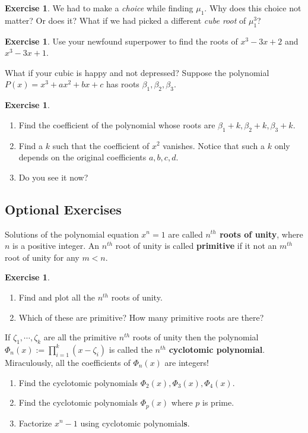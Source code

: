 \documentclass[reqno, 12pt, letter]{article}
\theoremstyle{plain}
\theoremstyle{definition}
\newtheorem{exercise}[theorem]{Exercise}
\theoremstyle{remark}
\numberwithin{equation}{section}
\begin{document}
	\begin{exercise}
		We had to make a \emph{choice} while finding $ \mu_1$. Why does this choice not matter? Or does it? What if we had picked a different \emph{cube root} of $ \mu_1^3$?
	\end{exercise}
	
	\begin{exercise}
		Use your newfound superpower to find the roots of $x^3 - 3x + 2$ and $x^3 - 3x + 1$.
	\end{exercise}
	
	What if your cubic is happy and not depressed? Suppose the polynomial $ P(x) = x^3 + ax^2 + bx + c$ has roots $ \beta_1, \beta_2, \beta_3$. 
	\begin{exercise} $ $
		\begin{enumerate}
			\item Find the coefficient of the polynomial whose roots are $ \beta_1 + k, \beta_2 + k, \beta_3 + k$.
			\item Find a $ k$ such that the coefficient of $ x^2$ vanishes. Notice that such a $ k$ only depends on the original coefficients $ a,b,c,d$.
			\item Do you see it now?
		\end{enumerate}
	\end{exercise}
	
	
	
	
	
	
	\subsection{Optional Exercises}
	
		Solutions of the polynomial equation $ x^n = 1$ are called \textbf{$n^{th}$ roots of unity}, where $ n$ is a positive integer. An $ n^{th}$ root of unity is called \textbf{primitive} if it not an $ m^{th}$ root of unity for any $ m < n$.
	
	\begin{exercise} $ $
		\begin{enumerate}
			\item Find and plot all the $ n^{th}$ roots of unity. 
			\item Which of these are primitive? How many primitive roots are there?
		\end{enumerate}
		If $ \zeta_1, \cdots, \zeta_k$ are all the primitive $ n^{th}$ roots of unity then the polynomial $ \Phi_n(x) := \prod _{i=1}^k (x - \zeta_i)$ is called the $ n^{th}$ \textbf{cyclotomic polynomial}. Miraculously, all the coefficients of $ \Phi_n(x)$ are integers!
		\begin{enumerate}[resume]
			\item Find the cyclotomic polynomials $ \Phi_2(x), \Phi_3(x), \Phi_4(x)$.
			\item Find the cyclotomic polynomials $ \Phi_p(x)$ where $ p$ is prime.
			\item Factorize $ x^n - 1$ using cyclotomic polynomial\textbf{s}.
		\end{enumerate}
	\end{exercise}
	
\end{document}
